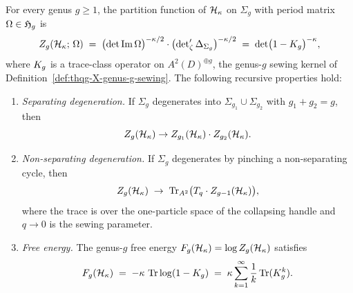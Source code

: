 \begin{theorem}%
%
For every genus $g \geq 1$, the partition function of
$\mathcal{H}_\kappa$ on $\Sigma_g$ with period matrix
$\Omega \in \mathfrak{H}_g$ is
\begin{equation}%
Z_g(\cH_\kappa;\,\Omega)
\;=\;
\bigl(\det\operatorname{Im}\Omega\bigr)^{-\kappa/2}
\cdot
\bigl(\zetareg\Delta_{\Sigma_g}\bigr)^{-\kappa/2}
\;=\;
\det\bigl(1 - \sewker_g\bigr)^{-\kappa},
\end{equation}
where $K_g$ is a trace-class operator on
$A^2(D)^{\oplus g}$, the genus-$g$ sewing kernel of
Definition~\textup{\ref{def:thqg-X-genus-g-sewing}}.
The following recursive properties hold:
\begin{enumerate}[label=\textup{(\roman*)}]
\item \emph{Separating degeneration.}
 If $\Sigma_g$ degenerates into $\Sigma_{g_1} \cup \Sigma_{g_2}$
 with $g_1 + g_2 = g$, then
 \begin{equation}%
 Z_g(\cH_\kappa) \to
 Z_{g_1}(\cH_\kappa) \cdot Z_{g_2}(\cH_\kappa).
 \end{equation}
\item \emph{Non-separating degeneration.}
 If $\Sigma_g$ degenerates by pinching a non-separating cycle,
 then
 \begin{equation}%
 Z_g(\cH_\kappa)
 \;\to\;
 \operatorname{Tr}_{A^2}\bigl(\sewop_q \cdot Z_{g-1}(\cH_\kappa)
 \bigr),
 \end{equation}
 where the trace is over the one-particle space of the
 collapsing handle and $q \to 0$ is the sewing parameter.
\item \emph{Free energy.}
 The genus-$g$ free energy
 $F_g(\mathcal{H}_\kappa) = \log Z_g(\mathcal{H}_\kappa)$ satisfies
 \begin{equation}%
 F_g(\cH_\kappa)
 \;=\;
 -\kappa\,\operatorname{Tr}\log(1 - \sewker_g)
 \;=\;
 \kappa\sum_{k=1}^{\infty}
 \frac{1}{k}\operatorname{Tr}(\sewker_g^k).
 \end{equation}
\end{enumerate}
\end{theorem}

